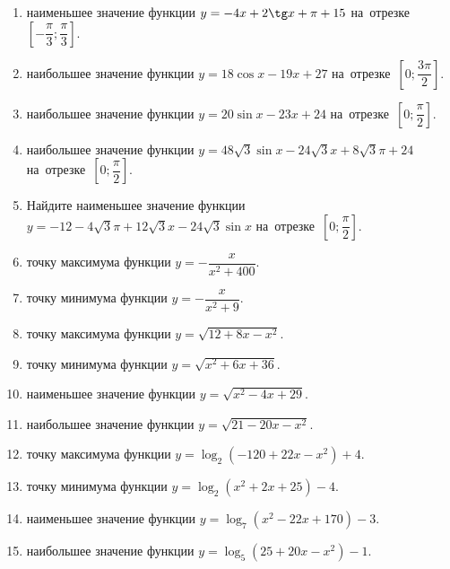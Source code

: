 \documentclass[a4paper,10pt]{article}
\begin{document}
\begin{enumerate}
\item {} наименьшее значение функции $y=-4x +2\tg x+\pi+15$ на~отрезке~$\left[-\dfrac{\pi}{3};\dfrac{\pi}{3}\right]$.

\item {} наибольшее значение функции $y=18\cos x-19x+27$ на~отрезке~$\left[0;\dfrac{3\pi}{2}\right]$.

\item {} наибольшее значение функции $y=20\sin x-23x+24$ на~отрезке~$\left[0;\dfrac{\pi}{2}\right]$.

\item {} наибольшее значение функции $y=48\sqrt{3}\sin x-24\sqrt{3}x+8\sqrt{3}\pi +24$ на~отрезке~$\left[0;\dfrac{\pi}{2}\right]$.

\item Найдите наименьшее значение функции $y=-12-4\sqrt{3}\pi+12\sqrt{3}x-24\sqrt{3}\sin x$ на~отрезке~$\left[0;\dfrac{\pi}{2}\right]$.

\item {} точку максимума функции $y=-\dfrac{x}{ x^2 +400}$.

\item {} точку минимума функции $y=-\dfrac{x}{ x^2 +9}$.

\item {} точку максимума функции $y=\sqrt{12+8x-x^2}$.

\item {} точку минимума функции $y=\sqrt{x^2+6x+36}$.

\item {} наименьшее значение функции $y=\sqrt{x^2-4x+29}$.

\item {} наибольшее значение функции $y=\sqrt{21-20x-x^2}$.

\item {} точку максимума функции $y=\log_2\left(-120+22x-x^2\right)+4$.

\item {} точку минимума функции $y=\log_2\left(x^2+2x+25\right)-4$.

\item {} наименьшее значение функции $y=\log_7\left(x^2-22x+170\right)-3$.

\item {} наибольшее значение функции $y=\log_5\left(25+20x-x^2\right)-1$.


\end{enumerate}
\end{document}
